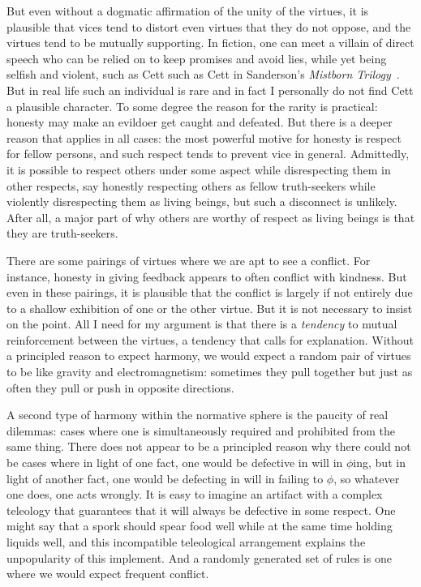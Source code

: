 But even without a dogmatic affirmation of the unity of the virtues, it is plausible that vices tend to distort even 
virtues that they do not oppose, and the virtues tend to be mutually supporting. In fiction, one can meet a villain 
of direct speech who can be relied on to keep promises and avoid lies, while yet being selfish and violent, such as Cett such as Cett in Sanderson's \textit{Mistborn Trilogy}~\parencite{SandersonWA,SandersonHA}.
But in real life such an individual is rare and in fact I personally do not find Cett a plausible character. To some degree 
the reason for the rarity is practical: honesty may make an evildoer
get caught and defeated. But there is a deeper reason that applies in all cases: the most powerful motive for honesty is respect 
for fellow persons, and such respect tends to prevent vice in general. Admittedly, it is possible to respect others 
under some aspect while disrespecting them in other respects, say honestly respecting others as fellow truth-seekers 
while violently disrespecting them as living beings, but such a disconnect is unlikely. After all, a major part of why others 
are worthy of respect as living beings is that they are truth-seekers.

There are some pairings of virtues where we are apt to see a conflict. For instance, honesty in giving feedback appears to 
often conflict with kindness. But even in these pairings, it is plausible that the conflict is largely if not entirely
due to a shallow exhibition of one or the other virtue. But it is not necessary to insist on the point. All I need 
for my argument is that there is a \textit{tendency} to mutual reinforcement between the virtues, a tendency that 
calls for explanation. Without a principled reason to expect harmony, we would expect a random pair of virtues to be 
like gravity and electromagnetism: sometimes they pull together but just as often they pull or push in opposite 
directions.

A second type of harmony within the normative sphere is the paucity of real dilemmas: cases where one is simultaneously
required and prohibited from the same thing. There does not appear to be a principled reason why there could not be 
cases where in light of one fact, one would be defective in will in $\phi$ing, but in light of another fact, one 
would be defecting in will in failing to $\phi$, so whatever one does, one acts wrongly. It is
easy to imagine an artifact with a complex teleology that guarantees that it will 
always be defective in some respect. One might say that a spork should spear food well while at the same time holding 
liquids well, and this incompatible teleological arrangement explains the unpopularity of this implement. And a randomly
generated set of rules is one where we would expect frequent conflict.

